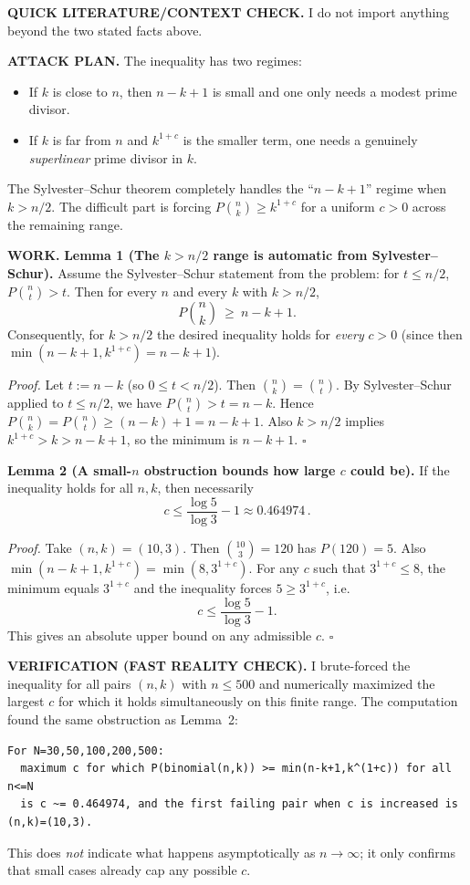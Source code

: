 \textbf{QUICK LITERATURE/CONTEXT CHECK.}
I do not import anything beyond the two stated facts above.

\textbf{ATTACK PLAN.}
The inequality has two regimes:
\begin{itemize}
\item If $k$ is close to $n$, then $n-k+1$ is small and one only needs a modest prime divisor.
\item If $k$ is far from $n$ and $k^{1+c}$ is the smaller term, one needs a genuinely \emph{superlinear} prime divisor in $k$.
\end{itemize}
The Sylvester--Schur theorem completely handles the ``$n-k+1$'' regime when $k>n/2$. The difficult part is forcing $P\!\binom{n}{k} \ge k^{1+c}$ for a uniform $c>0$ across the remaining range.

\textbf{WORK.}
\textbf{Lemma 1 (The $k>n/2$ range is automatic from Sylvester--Schur).}
Assume the Sylvester--Schur statement from the problem: for $t\le n/2$, $P\!\binom{n}{t}>t$.
Then for every $n$ and every $k$ with $k>n/2$,
\[
P\!\binom{n}{k}\ \ge\ n-k+1.
\]
Consequently, for $k>n/2$ the desired inequality holds for \emph{every} $c>0$ (since then $\min(n-k+1,k^{1+c})=n-k+1$).

\emph{Proof.}
Let $t:=n-k$ (so $0\le t < n/2$). Then $\binom{n}{k}=\binom{n}{t}$.
By Sylvester--Schur applied to $t\le n/2$, we have $P\!\binom{n}{t}>t=n-k$.
Hence $P\!\binom{n}{k}=P\!\binom{n}{t}\ge (n-k)+1=n-k+1$.
Also $k>n/2$ implies $k^{1+c}>k>n-k+1$, so the minimum is $n-k+1$.
\hfill$\square$

\textbf{Lemma 2 (A small-$n$ obstruction bounds how large $c$ could be).}
If the inequality holds for all $n,k$, then necessarily
\[
c\le \frac{\log 5}{\log 3}-1\approx 0.464974\,.
\]

\emph{Proof.}
Take $(n,k)=(10,3)$. Then $\binom{10}{3}=120$ has $P(120)=5$.
Also $\min(n-k+1,k^{1+c})=\min(8,3^{1+c})$.
For any $c$ such that $3^{1+c}\le 8$, the minimum equals $3^{1+c}$ and the inequality forces
$5\ge 3^{1+c}$, i.e.
\[c\le \frac{\log 5}{\log 3}-1.
\]
This gives an absolute upper bound on any admissible $c$.
\hfill$\square$

\textbf{VERIFICATION (FAST REALITY CHECK).}
I brute-forced the inequality for all pairs $(n,k)$ with $n\le 500$ and numerically maximized the largest $c$ for which it holds simultaneously on this finite range.
The computation found the same obstruction as Lemma~2:
\begin{verbatim}
For N=30,50,100,200,500:
  maximum c for which P(binomial(n,k)) >= min(n-k+1,k^(1+c)) for all n<=N
  is c ~= 0.464974, and the first failing pair when c is increased is (n,k)=(10,3).
\end{verbatim}
This does \emph{not} indicate what happens asymptotically as $n\to\infty$; it only confirms that small cases already cap any possible $c$.

